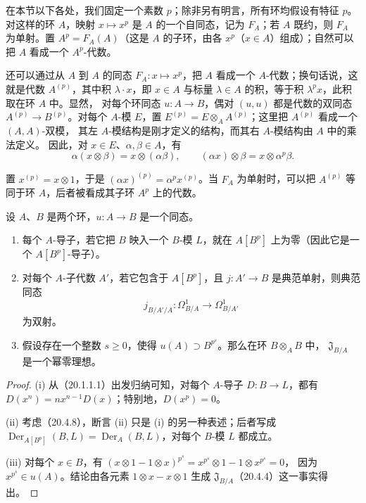\begin{env}[21.1.4]
\label{0.21.1.4-fr}
在本节以下各处，我们固定一个素数 $p$；除非另有明言，所有环均假设有特征 $p$。
对这样的环 $A$，映射 $x\mapsto x^p$ 是 $A$ 的一个自同态，记为 $F_A$；若
$A$ 既约，则 $F_A$ 为单射。置 $A^p=F_A(A)$（这是 $A$ 的子环，由各
$x^p$（$x\in A$）组成）；自然可以把 $A$ 看成一个 $A^p$-代数。

还可以通过从 $A$ 到 $A$ 的同态 $F_A:x\mapsto x^p$，把 $A$ 看成一个
$A$-代数；换句话说，这就是代数 $A^{(p)}$，其中积 $\lambda\cdot x$，即
$x\in A$ 与标量 $\lambda\in A$ 的积，等于积 $\lambda^p x$，此积取在环
$A$ 中。显然，
对每个环同态 $u:A\to B$，偶对 $(u,u)$ 都是代数的双同态
$A^{(p)}\to B^{(p)}$。对每个 $A$-模 $E$，置
$E^{(p)}=E\otimes_A A^{(p)}$；这里把 $A^{(p)}$ 看成一个 $(A,A)$-双模，
其左 $A$-模结构是刚才定义的结构，而其右 $A$-模结构由 $A$ 中的乘法定义。
因此，对 $x\in E$、$\alpha,\beta\in A$，有
\[
  \alpha(x\otimes\beta)=x\otimes(\alpha\beta),\qquad
  (\alpha x)\otimes\beta=x\otimes\alpha^p\beta.
\]
\end{env}

置 $x^{(p)}=x\otimes1$，于是 $(\alpha x)^{(p)}=\alpha^p x^{(p)}$。当 $F_A$
为单射时，可以把 $A^{(p)}$ 等同于环 $A$，后者被看成其子环 $A^p$ 上的代数。

\begin{proposition}[21.1.5]
\label{0.21.1.5-fr}
设 $A$、$B$ 是两个环，$u:A\to B$ 是一个同态。
\begin{enumerate}
  \item[(i)] 每个 $A$-导子，若它把 $B$ 映入一个 $B$-模 $L$，就在 $A[B^p]$
  上为零（因此它是一个 $A[B^p]$-导子）。
  \item[(ii)] 对每个 $A$-子代数 $A'$，若它包含于 $A[B^p]$，且
  $j:A'\to B$ 是典范单射，则典范同态
  \[
  j_{B/A'/A}:\Omega^1_{B/A}\longrightarrow\Omega^1_{B/A'}
  \]
  为双射。
  \item[(iii)] 假设存在一个整数 $s\geq0$，使得
  $u(A)\supset B^{p^s}$。那么在环 $B\otimes_A B$ 中，
  $\mathfrak J_{B/A}$ 是一个幂零理想。
\end{enumerate}
\end{proposition}

\begin{proof}
(i) 从（20.1.1.1）出发归纳可知，对每个 $A$-导子 $D:B\to L$，都有
$D(x^n)=nx^{n-1}D(x)$；特别地，$D(x^p)=0$。

(ii) 考虑（20.4.8），断言 (ii) 只是 (i) 的另一种表述；后者写成
$\operatorname{Der}_{A[B^p]}(B,L)=\operatorname{Der}_A(B,L)$，对每个
$B$-模 $L$ 都成立。

(iii) 对每个 $x\in B$，有
$(x\otimes1-1\otimes x)^{p^s}=x^{p^s}\otimes1-1\otimes x^{p^s}=0$，
因为 $x^{p^s}\in u(A)$。结论由各元素
$1\otimes x-x\otimes1$ 生成 $\mathfrak J_{B/A}$（20.4.4）这一事实得出。
\end{proof}

